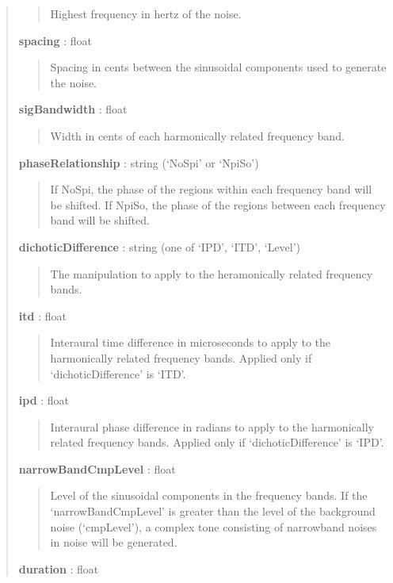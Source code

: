 \documentclass[a4paper,12pt,english]{sphinxmanual}
\begin{document}
\begin{fulllineitems}
\begin{quote}
\begin{description}
\begin{quote}
Highest frequency in hertz of the noise.
\end{quote}

\textbf{spacing} : float
\begin{quote}

Spacing in cents between the sinusoidal components used to generate the
noise.
\end{quote}

\textbf{sigBandwidth} : float
\begin{quote}

Width in cents of each harmonically related frequency band.
\end{quote}

\textbf{phaseRelationship} : string (`NoSpi' or `NpiSo')
\begin{quote}

If NoSpi, the phase of the regions within each frequency band will
be shifted. If NpiSo, the phase of the regions between each
frequency band will be shifted.
\end{quote}

\textbf{dichoticDifference} : string (one of `IPD', `ITD', `Level')
\begin{quote}

The manipulation to apply to the heramonically related
frequency bands.
\end{quote}

\textbf{itd} : float
\begin{quote}

Interaural time difference in microseconds to apply
to the harmonically related frequency bands. Applied
only if `dichoticDifference' is `ITD'.
\end{quote}

\textbf{ipd} : float
\begin{quote}

Interaural phase difference in radians to apply
to the harmonically related frequency bands. Applied
only if `dichoticDifference' is `IPD'.
\end{quote}

\textbf{narrowBandCmpLevel} : float
\begin{quote}

Level of the sinusoidal components in the frequency bands.
If the `narrowBandCmpLevel' is greater than the level
of the background noise (`cmpLevel'), a complex tone
consisting of narrowband noises in noise will be generated.
\end{quote}

\textbf{duration} : float
\begin{quote}


\end{quote}
\end{description}
\end{quote}
\end{fulllineitems}
\end{document}
